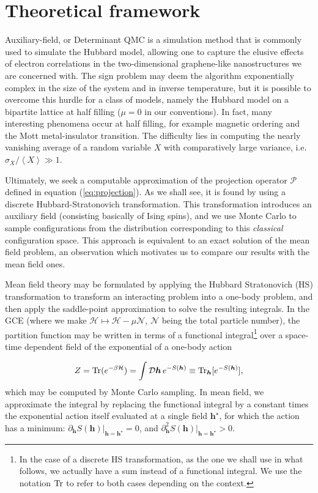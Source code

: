 \section{Theoretical framework}
\label{subsec:theoreticalFramework}

Auxiliary-field, or Determinant \acs{QMC} is a simulation method that is commonly used to simulate the Hubbard model, allowing one to capture the elusive effects of electron correlations in the two-dimensional graphene-like nanostructures we are concerned with.
The sign problem may deem the algorithm exponentially complex in the size of the system and in inverse temperature, but it is possible to overcome this hurdle for a class of models, namely the Hubbard model on a bipartite lattice at half filling ($\mu = 0$ in our conventions).
In fact, many interesting phenomena occur at half filling, for example magnetic ordering and the Mott metal-insulator transition.
The difficulty lies in computing the nearly vanishing average of a random variable $X$ with comparatively large variance, i.e. $\sigma_X / \left\langle X \right\rangle \gg 1$.

Ultimately, we seek a computable approximation of the projection operator $\mathcal{P}$ defined in equation (\ref{eq:projection}).
As we shall see, it is found by using a discrete Hubbard-Stratonovich transformation.
This transformation introduces an auxiliary field (consisting basically of Ising spins), and we use Monte Carlo to sample configurations from the distribution corresponding to this \emph{classical} configuration space.
This approach is equivalent to an exact solution of the mean field problem, an observation which motivates us to compare our results with the mean field ones.

Mean field theory may be formulated by applying the Hubbard Stratonovich (HS)  transformation to transform an interacting problem into a one-body problem, and then apply the saddle-point approximation to solve the resulting integrals.
In the \ac{GCE} (where we make $\mathcal{H} \mapsto \mathcal{H} - \mu \mathcal{N}$, $\mathcal{N}$ being the total particle number), the partition function may be written in terms of a functional integral\footnote{In the case of a discrete HS transformation, as the one we shall use in what follows, we actually have a sum instead of a functional integral. We use the notation $\operatorname{Tr}$ to refer to both cases depending on the context.} over a space-time dependent field of the exponential of a one-body action

\begin{equation}
Z = \operatorname{Tr} ( e^{-\beta \mathcal{H} } ) = \int \mathcal{D} \bm h \, e^{-S(\bm h) }  \equiv \operatorname{Tr}_{\bm h} [ e^{-S(\bm h)} ],
\end{equation}
which may be computed by Monte Carlo sampling.
In mean field, we approximate the integral by replacing the functional integral by a constant times the exponential action itself evaluated at a single field $\bm h^\star$, for which the action has a minimum: $\partial_{\bm h} S( \bm h ) |_{\bm h = \bm h^\star} = 0$, and $\partial_{\bm h}^2 S( \bm h ) |_{\bm h = \bm h^\star} > 0$.


